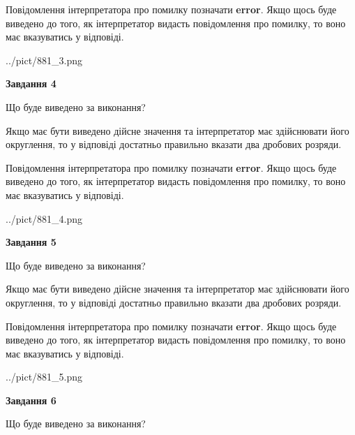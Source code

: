\documentclass[12pt, ukrainian]{article}
\begin{document}
{\begin {Large}
Повідомлення інтерпретатора про помилку позначати \textbf{error}.
Якщо щось буде виведено до того, як інтерпретатор видасть повідомлення про помилку, 
то воно має вказуватись у відповіді. \par

\begin{center}
	{../pict/881_3.png}
\end{center}
\newpage

{\begin {center}\textbf{Завдання 4}\end {center}}\par
Що буде виведено за виконання? \par

Якщо має бути виведено дійсне значення та інтерпретатор має здійснювати його округлення, 
то у відповіді достатньо правильно вказати два дробових розряди.

Повідомлення інтерпретатора про помилку позначати \textbf{error}.
Якщо щось буде виведено до того, як інтерпретатор видасть повідомлення про помилку, 
то воно має вказуватись у відповіді. \par

\begin{center}
	{../pict/881_4.png}
\end{center}
\newpage

{\begin {center}\textbf{Завдання 5}\end {center}}\par
Що буде виведено за виконання? \par

Якщо має бути виведено дійсне значення та інтерпретатор має здійснювати його округлення, 
то у відповіді достатньо правильно вказати два дробових розряди.

Повідомлення інтерпретатора про помилку позначати \textbf{error}.
Якщо щось буде виведено до того, як інтерпретатор видасть повідомлення про помилку, 
то воно має вказуватись у відповіді. \par

\begin{center}
	{../pict/881_5.png}
\end{center}
\newpage

{\begin {center}\textbf{Завдання 6}\end {center}}\par
Що буде виведено за виконання? \par


\end{Large}}
\end{document}
